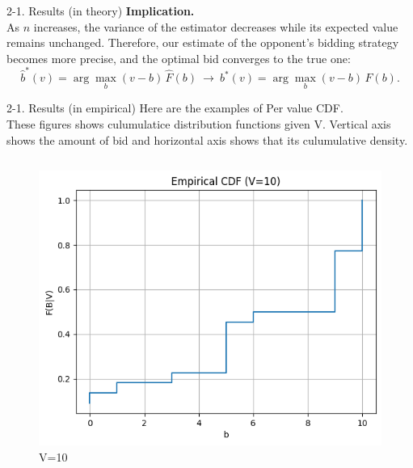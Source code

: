 \documentclass{beamer}
\begin{document}
\begin{frame}{2-1. Results (in theory)}
\textbf{Implication.}\\
As $n$ increases, the variance of the estimator decreases
while its expected value remains unchanged.
Therefore, our estimate of the opponent’s bidding strategy
becomes more precise, and the optimal bid converges to the true one:
\[
\hat b^*(v)=\arg\max_{b}(v-b)\,\hat F(b)
\ \longrightarrow\
b^*(v)=\arg\max_{b}(v-b)\,F(b).
\]
\end{frame}

\begin{frame}{2-1. Results (in empirical)}
Here are the examples of Per value CDF.\\
These figures shows culumulatice distribution functions given V. Vertical axis shows the amount of bid and horizontal axis shows that its culumulative density.
\begin{columns}[T,onlytextwidth]
  \begin{figure}
    \centering
    \includegraphics[width=\linewidth]{332Project1/figures/v=10.png}
    \caption{V=10}\label{fig:v10}
  \end{figure}


\end{columns}
\end{frame}
\end{document}
